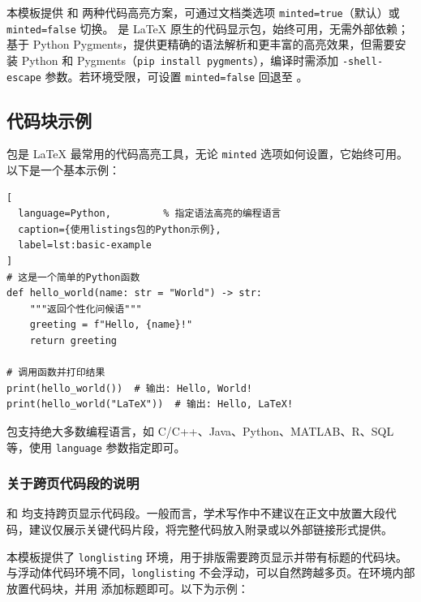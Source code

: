 本模板提供  和  两种代码高亮方案，可通过文档类选项 \texttt{minted=true}（默认）或 \texttt{minted=false} 切换。 是 \LaTeX{} 原生的代码显示包，始终可用，无需外部依赖； 基于 Python Pygments，提供更精确的语法解析和更丰富的高亮效果，但需要安装 Python 和 Pygments（\texttt{pip install pygments}），编译时需添加 \texttt{-shell-escape} 参数。若环境受限，可设置 \texttt{minted=false} 回退至 。

\subsection{代码块示例}

 包是 \LaTeX{} 最常用的代码高亮工具，无论 \texttt{minted} 选项如何设置，它始终可用。以下是一个基本示例：

\begin{lstlisting}[
  language=Python,         % 指定语法高亮的编程语言
  caption={使用listings包的Python示例},
  label=lst:basic-example
]
# 这是一个简单的Python函数
def hello_world(name: str = "World") -> str:
    """返回个性化问候语"""
    greeting = f"Hello, {name}!"
    return greeting

# 调用函数并打印结果
print(hello_world())  # 输出: Hello, World!
print(hello_world("LaTeX"))  # 输出: Hello, LaTeX!
\end{lstlisting}

 包支持绝大多数编程语言，如 C/C++、Java、Python、MATLAB、R、SQL 等，使用 \texttt{language} 参数指定即可。

\subsubsection{关于跨页代码段的说明}
 和  均支持跨页显示代码段。一般而言，学术写作中不建议在正文中放置大段代码，建议仅展示关键代码片段，将完整代码放入附录或以外部链接形式提供。

本模板提供了 \texttt{longlisting} 环境，用于排版需要跨页显示并带有标题的代码块。与浮动体代码环境不同，\texttt{longlisting} 不会浮动，可以自然跨越多页。在环境内部放置代码块，并用  添加标题即可。以下为示例：


